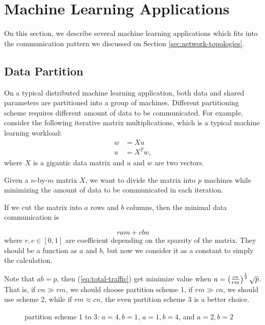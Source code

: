 \documentclass{acm_proc_article-sp}
\begin{document}
\section{Machine Learning Applications}

On this section, we describe several machine learning applications which fits
into the communication pattern we discussed on Section
\ref{sec:network-topologies}.

\subsection{Data Partition}

On a typical distributed machine learning application, both data and shared
parameters are partitioned into a group of machines.
Different partitioning scheme requires different amount of data to be
communicated. For example, consider the following iterative matrix
multiplications, which is a typical machine learning workload:
\begin{align*}
w &= X u \\
u &= X^T w,
\end{align*}
where $X$ is a gigantic data matrix and $u$ and $w$ are two vectors.

Given a $n$-by-$m$ matrix $X$, we want to divide the matrix into $p$ machines
while minimizing the amount of data to be communicated in each iteration.

If we cut the matrix into $a$ rows and $b$ columns, then the minimal data
communication is

\begin{equation}
  r  am +  c bn
  \label{eq:total-traffic}
\end{equation}
where $r,c \in [0,1]$ are coefficient depending on the sparsity of the
matrix. They should be a function as $a$ and $b$, but now we consider it as a
constant to simply the calculation.

Note that $ab=p$, then (\ref{eq:total-traffic}) get minimize value when
$a = \left( \frac{cn}{rm} \right)^{\frac{1}{2}}\sqrt{p}$. That is, if $cn \gg rm$, we
should choose partition scheme 1, if $rm \gg cn$, we should use scheme 2, while
if $rm \approx cn$, the even partition scheme 3 is a better choice.

\begin{figure}[th!]
  \centering
{}
  \caption{partition scheme 1 to 3: $a=4,b=1$, $a=1,b=4$, and $a=2,b=2$}
\end{figure}
\end{document}
